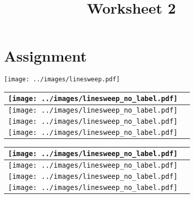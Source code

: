 \documentclass[a4paper,12pt]{article}
\title{Worksheet 2}
\begin{document}
\maketitle

\worksheetGroundRules

\worksheetSubmission


\vspace{5pt}
\section{Assignment}

\vspace{10pt}


\begin{center}
\texttt{[image: ../images/linesweep.pdf]}
\end{center}


\newpage

\begin{tabular}[!h]{|p{6cm}|p{10cm}|}
\hline
\texttt{[image: ../images/linesweep\_no\_label.pdf]} & \\
\hline
\texttt{[image: ../images/linesweep\_no\_label.pdf]} & \\
\hline
\texttt{[image: ../images/linesweep\_no\_label.pdf]} & \\
\hline
\texttt{[image: ../images/linesweep\_no\_label.pdf]} & \\
\hline
\end{tabular}

\begin{tabular}[!h]{|p{6cm}|p{10cm}|}
\hline
\texttt{[image: ../images/linesweep\_no\_label.pdf]} & \\
\hline
\texttt{[image: ../images/linesweep\_no\_label.pdf]} & \\
\hline
\texttt{[image: ../images/linesweep\_no\_label.pdf]} & \\
\hline
\texttt{[image: ../images/linesweep\_no\_label.pdf]} & \\
\hline
\end{tabular}
\end{document}

